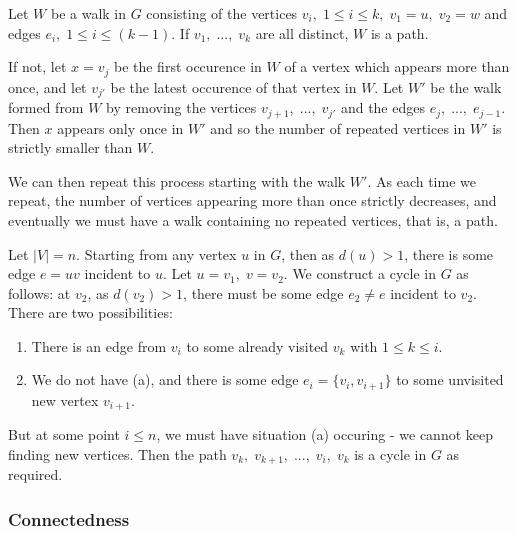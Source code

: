 {Let \(W\) be a walk in \(G\) consisting of the vertices \(v_i,\;1 \leq i \leq k,\;v_1 = u,\;v_2 = w\) and edges \(e_i,\; 1 \leq i \leq (k-1)\). If \(v_1,\;...,\;v_k\) are all distinct, \(W\) is a path. 

If not, let \(x=v_j\) be the first occurence in \(W\) of a vertex which appears more than once, and let \(v_{j'}\) be the latest occurence of that vertex in \(W\). Let \(W'\) be the walk formed from \(W\) by removing the vertices \(v_{j+1},\;...,\;v_{j'}\) and the edges \(e_j,\;...,\;e_{j-1}\). Then \(x\) appears only once in \(W'\) and so the number of repeated vertices in \(W'\) is strictly smaller than \(W\). 

We can then repeat this process starting with the walk \(W'\). As each time we repeat, the number of vertices appearing more than once strictly decreases, and eventually we must have a walk containing no repeated vertices, that is, a path.}

{Let \(|V| = n\). Starting from any vertex \(u\) in \(G\), then as \(d(u) > 1\), there is some edge \(e=uv\) incident to \(u\). Let \(u=v_1,\;v=v_2\). We construct a cycle in \(G\) as follows: at \(v_2\), as \(d(v_2) > 1\), there must be some edge \(e_2 \neq e\) incident to \(v_2\). There are two possibilities:
\begin{enumerate}[label=(\alph*)]
    \item There is an edge from \(v_i\) to some already visited \(v_k\) with \(1 \leq k \leq i\).
    \item We do not have (a), and there is some edge \(e_i = \{v_i,v_{i+1}\}\) to some unvisited new vertex \(v_{i+1}\).
\end{enumerate}
But at some point \(i \leq n\), we must have situation (a) occuring - we cannot keep finding new vertices. Then the path \(v_k,\;v_{k+1},\;...,\;v_i,\;v_k\) is a cycle in \(G\) as required.}

\newpage\subsubsection{Connectedness}


